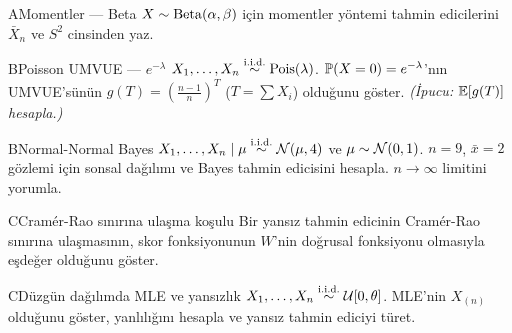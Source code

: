 \alistirmalar

\begin{alistirma}[Al.12.3]{A}{Momentler --- Beta}
$X\sim\operatorname{Beta}(\alpha,\beta)$ için momentler yöntemi tahmin edicilerini $\bar{X}_n$ ve $S^2$ cinsinden yaz.
\end{alistirma}

\begin{alistirma}[Al.12.4]{B}{Poisson UMVUE --- $e^{-\lambda}$}
$X_1,\ldots,X_n\overset{\text{i.i.d.}}{\sim}\operatorname{Pois}(\lambda)$. $\mathbb{P}(X=0)=e^{-\lambda}$'nın UMVUE'sünün $g(T)=\left(\frac{n-1}{n}\right)^T$ ($T=\sum X_i$) olduğunu göster. \textit{(İpucu: $\mathbb{E}[g(T)]$ hesapla.)}
\end{alistirma}

\begin{alistirma}[Al.12.5]{B}{Normal-Normal Bayes}
$X_1,\ldots,X_n\mid\mu\overset{\text{i.i.d.}}{\sim}\mathcal{N}(\mu,4)$ ve $\mu\sim\mathcal{N}(0,1)$. $n=9$, $\bar{x}=2$ gözlemi için sonsal dağılımı ve Bayes tahmin edicisini hesapla. $n\to\infty$ limitini yorumla.
\end{alistirma}

\begin{alistirma}[Al.12.6]{C}{Cramér-Rao sınırına ulaşma koşulu}
Bir yansız tahmin edicinin Cramér-Rao sınırına ulaşmasının, skor fonksiyonunun $W$'nin doğrusal fonksiyonu olmasıyla eşdeğer olduğunu göster.
\end{alistirma}

\begin{alistirma}[Al.12.7]{C}{Düzgün dağılımda MLE ve yansızlık}
$X_1,\ldots,X_n\overset{\text{i.i.d.}}{\sim}\mathcal{U}[0,\theta]$. MLE'nin $X_{(n)}$ olduğunu göster, yanlılığını hesapla ve yansız tahmin ediciyi türet.
\end{alistirma}

